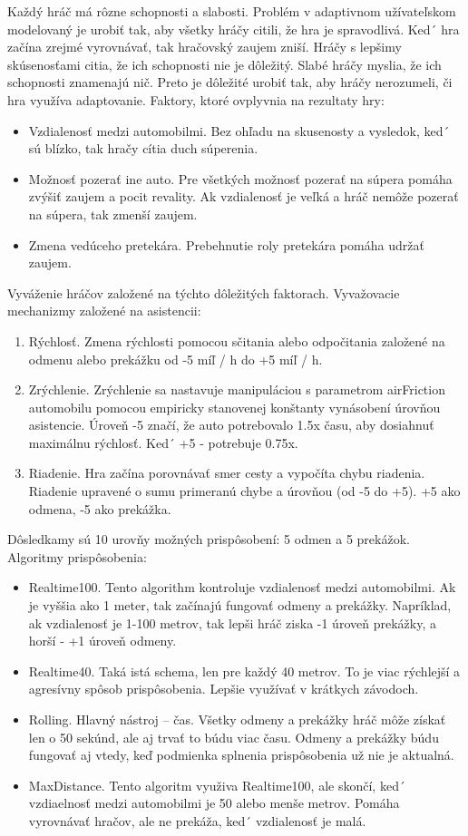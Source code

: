 \documentclass[10pt,twoside,slovak,a4paper]{article}
\begin{document}
Každý hráč má rôzne schopnosti a slabosti. Problém v adaptivnom užívateľskom modelovaný je urobiť tak, aby všetky hráčy citili, že hra je spravodlivá. Ked´ hra začína zrejmé vyrovnávať, tak hračovský zaujem zniší.  Hráčy s lepšimy skúsenosťami citia, že ich schopnosti nie je dôležitý. Slabé hráčy myslia, že ich schopnosti znamenajú nič. Preto je dôležité urobiť tak, aby hráčy nerozumeli, či hra využíva adaptovanie.
Faktory, ktoré ovplyvnia na rezultaty hry:
\begin{itemize}
\item Vzdialenosť medzi automobilmi. Bez ohľadu na skusenosty a vysledok, ked´ sú blízko, tak hračy cítia duch súperenia.
\item Možnosť pozerať ine auto. Pre všetkých možnosť pozerať na súpera pomáha zvýšiť zaujem a pocit revality. Ak vzdialenosť je veľká a hráč nemôže pozerať na súpera, tak zmenší zaujem.
\item Zmena vedúceho pretekára. Prebehnutie roly pretekára pomáha udržať zaujem.
\end{itemize}
Vyváženie hráčov založené na týchto dôležitých faktorach. 
	Vyvažovacie mechanizmy založené na asistencii:
\begin{enumerate}
\item Rýchlosť. Zmena rýchlosti pomocou sčitania alebo odpočitania založené na odmenu alebo prekážku od -5 míľ / h do +5 míľ / h.
\item Zrýchlenie. Zrýchlenie sa nastavuje manipuláciou s parametrom airFriction automobilu pomocou empiricky stanovenej konštanty vynásobení úrovňou asistencie. Úroveň -5 značí, že auto potrebovalo 1.5x času, aby dosiahnuť maximálnu rýchlosť. Ked´ +5 - potrebuje 0.75x.
\item Riadenie. Hra začína porovnávať smer cesty a vypočíta chybu riadenia. Riadenie upravené o sumu primeranú chybe a úrovňou (od -5 do +5). +5  ako odmena, -5 ako prekážka.
\end{enumerate}
Dôsledkamy sú 10 urovňy možných prispôsobení: 5 odmen a 5 prekážok. 
	Algoritmy prispôsobenia:
\begin{itemize}
\item Realtime100. Tento algorithm kontroluje vzdialenosť medzi automobilmi. Ak je vyššia ako 1 meter, tak začínajú fungovať odmeny a prekážky. Napríklad, ak vzdialenosť je 1-100 metrov, tak lepši hráč ziska -1 úroveň prekážky, a horší - +1 úroveň odmeny.
\item Realtime40. Taká istá schema, len pre každý 40 metrov. To je viac rýchlejší a agresívny spôsob prispôsobenia. Lepšie využívať v krátkych závodoch.
\item Rolling. Hlavný nástroj – čas. Všetky odmeny a prekážky hráč môže získať len o 50 sekúnd, ale aj trvať to búdu viac času. Odmeny a prekážky búdu fungovať aj vtedy, keď podmienka splnenia prispôsobenia už nie je aktualná.
\item MaxDistance. Tento algoritm využiva Realtime100, ale skončí, ked´ vzdiaelnosť medzi automobilmi je 50 alebo menše metrov. Pomáha vyrovnávať hračov, ale ne prekáža, ked´ vzdialenosť je malá.
\end{itemize}
\end{document}
